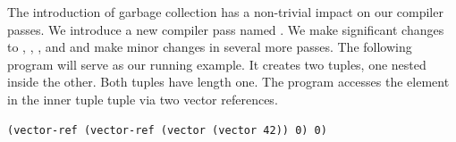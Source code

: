 \documentclass[11pt]{book}
\newtheorem{exercise}[theorem]{Exercise}
\begin{document}



The introduction of garbage collection has a non-trivial impact on our
compiler passes. We introduce a new compiler pass named
. We make
significant changes to ,
, , and
 and make minor changes in several more passes.  The
following program will serve as our running example.  It creates two
tuples, one nested inside the other. Both tuples have length one. The
program accesses the element in the inner tuple tuple via two vector
references.
\begin{lstlisting}
(vector-ref (vector-ref (vector (vector 42)) 0) 0)
\end{lstlisting}
\end{document}
